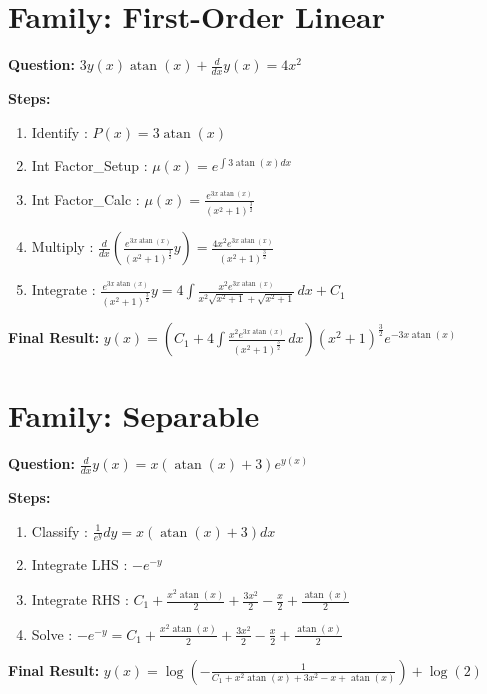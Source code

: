 \documentclass{article}
\begin{document}
\section*{Family: First-Order Linear}
\textbf{Question:} $3 y{\left(x \right)} \operatorname{atan}{\left(x \right)} + \frac{d}{d x} y{\left(x \right)} = 4 x^{2}$

\textbf{Steps:}
\begin{enumerate}
\item Identify :  $P(x) = 3 \operatorname{atan}{\left(x \right)}$
\item Int Factor_Setup :  $\mu(x) = e^{\int 3 \operatorname{atan}{\left(x \right)} dx}$
\item Int Factor_Calc :  $\mu(x) = \frac{e^{3 x \operatorname{atan}{\left(x \right)}}}{\left(x^{2} + 1\right)^{\frac{3}{2}}}$
\item Multiply :  $\frac{d}{dx}(\frac{e^{3 x \operatorname{atan}{\left(x \right)}}}{\left(x^{2} + 1\right)^{\frac{3}{2}}}y) = \frac{4 x^{2} e^{3 x \operatorname{atan}{\left(x \right)}}}{\left(x^{2} + 1\right)^{\frac{3}{2}}}$
\item Integrate :  $\frac{e^{3 x \operatorname{atan}{\left(x \right)}}}{\left(x^{2} + 1\right)^{\frac{3}{2}}}y = 4 \int \frac{x^{2} e^{3 x \operatorname{atan}{\left(x \right)}}}{x^{2} \sqrt{x^{2} + 1} + \sqrt{x^{2} + 1}}\, dx + C_1$
\end{enumerate}
\textbf{Final Result:} $y{\left(x \right)} = \left(C_{1} + 4 \int \frac{x^{2} e^{3 x \operatorname{atan}{\left(x \right)}}}{\left(x^{2} + 1\right)^{\frac{3}{2}}}\, dx\right) \left(x^{2} + 1\right)^{\frac{3}{2}} e^{- 3 x \operatorname{atan}{\left(x \right)}}$

\section*{Family: Separable}
\textbf{Question:} $\frac{d}{d x} y{\left(x \right)} = x \left(\operatorname{atan}{\left(x \right)} + 3\right) e^{y{\left(x \right)}}$

\textbf{Steps:}
\begin{enumerate}
\item Classify :  $\frac{1}{e^{y}} dy = x \left(\operatorname{atan}{\left(x \right)} + 3\right) dx$
\item Integrate LHS :  $- e^{- y}$
\item Integrate RHS :  $C_{1} + \frac{x^{2} \operatorname{atan}{\left(x \right)}}{2} + \frac{3 x^{2}}{2} - \frac{x}{2} + \frac{\operatorname{atan}{\left(x \right)}}{2}$
\item Solve :  $- e^{- y} = C_{1} + \frac{x^{2} \operatorname{atan}{\left(x \right)}}{2} + \frac{3 x^{2}}{2} - \frac{x}{2} + \frac{\operatorname{atan}{\left(x \right)}}{2}$
\end{enumerate}
\textbf{Final Result:} $y{\left(x \right)} = \log{\left(- \frac{1}{C_{1} + x^{2} \operatorname{atan}{\left(x \right)} + 3 x^{2} - x + \operatorname{atan}{\left(x \right)}} \right)} + \log{\left(2 \right)}$
\end{document}

